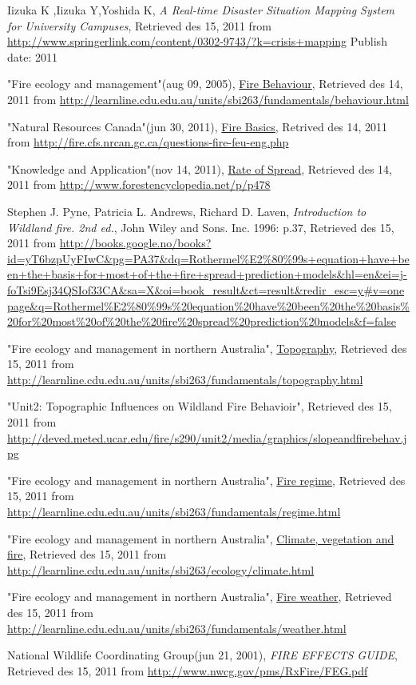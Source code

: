 \begin{thebibliography}{4}
 Iizuka K ,Iizuka Y,Yoshida K, \emph{A Real-time Disaster Situation Mapping System for University Campuses}, Retrieved des 15, 2011 from \url{http://www.springerlink.com/content/0302-9743/?k=crisis+mapping} Publish date: 2011

 "Fire ecology and management"(aug 09, 2005), \underline{Fire Behaviour}, Retrieved des 14, 2011 from \url{http://learnline.cdu.edu.au/units/sbi263/fundamentals/behaviour.html}

 "Natural Resources Canada"(jun 30, 2011), \underline{Fire Basics}, Retrived des 14, 2011 from \url{http://fire.cfs.nrcan.gc.ca/questions-fire-feu-eng.php}

 "Knowledge and Application"(nov 14, 2011), \underline{Rate of Spread}, Retrieved des 14, 2011 from \url{http://www.forestencyclopedia.net/p/p478}

 Stephen J. Pyne, Patricia L. Andrews, Richard D. Laven, \emph{Introduction to Wildland fire. 2nd ed.}, John Wiley and Sons. Inc. 1996: p.37, Retrieved des 15, 2011 from
\url{http://books.google.no/books?id=yT6bzpUyFIwC&pg=PA37&dq=Rothermel%E2%80%99s+equation+have+been+the+basis+for+most+of+the+fire+spread+prediction+models&hl=en&ei=j-foTsi9Esj34QSIof33CA&sa=X&oi=book_result&ct=result&redir_esc=y#v=onepage&q=Rothermel%E2%80%99s%20equation%20have%20been%20the%20basis%20for%20most%20of%20the%20fire%20spread%20prediction%20models&f=false}

 "Fire ecology and management in northern Australia", \underline{Topography}, Retrieved des 15, 2011 from \url{http://learnline.cdu.edu.au/units/sbi263/fundamentals/topography.html}

 "Unit2: Topographic Influences on Wildland Fire Behavioir", Retrieved des 15, 2011 from \url{http://deved.meted.ucar.edu/fire/s290/unit2/media/graphics/slopeandfirebehav.jpg}

 "Fire ecology and management in northern Australia", \underline{Fire regime}, Retrieved des 15, 2011 from \url{http://learnline.cdu.edu.au/units/sbi263/fundamentals/regime.html}

 "Fire ecology and management in northern Australia", \underline{Climate, vegetation and fire}, Retrieved des 15, 2011 from \url{http://learnline.cdu.edu.au/units/sbi263/ecology/climate.html}

 "Fire ecology and management in northern Australia", \underline{Fire weather}, Retrieved des 15, 2011 from \url{http://learnline.cdu.edu.au/units/sbi263/fundamentals/weather.html}

 National Wildlife Coordinating Group(jun 21, 2001), \emph{FIRE EFFECTS GUIDE}, Retrieved des 15, 2011 from \url{http://www.nwcg.gov/pms/RxFire/FEG.pdf}

\end{thebibliography}
